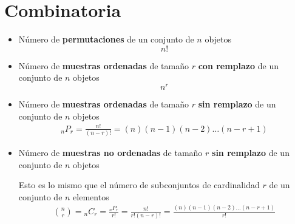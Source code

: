 \documentclass[12pt, fleqn]{report}                             %
\theoremstyle{break}                                            %
\begin{document}
        \clearpage
        \section{Combinatoria}

            \begin{itemize}
                \item 
                    Número de \textbf{permutaciones} de un conjunto de $n$ objetos
                    \begin{equation*}
                        n!
                    \end{equation*}

                \item
                    Número de \textbf{muestras ordenadas} de tamaño $r$
                    \textbf{con remplazo} de un conjunto de $n$ objetos
                    \begin{equation*}
                        n^r
                    \end{equation*}

                \item
                    Número de \textbf{muestras ordenadas} de tamaño $r$
                    \textbf{sin remplazo} de un conjunto de $n$ objetos
                    \begin{align*}
                        {}_nP_r
                            = \frac{n!}{(n - r)!}          
                            = (n)(n-1)(n-2)\dots(n-r+1) 
                    \end{align*}

                \item
                    Número de \textbf{muestras no ordenadas} de tamaño $r$
                    \textbf{sin remplazo} de un conjunto de $n$ objetos

                    Esto es lo mismo que el número de subconjuntos de cardinalidad $r$ de
                    un conjunto de $n$ elementos
                    \begin{align*}
                        {n \choose r}
                            = {}_nC_r 
                            = \frac{{}_nP_r}{r!}          
                            = \frac{n!}{r!(n-r)!}          
                            = \frac{(n)(n-1)(n-2)\dots(n-r+1)}{r!}          
                    \end{align*}


\end{itemize}
\end{document}
